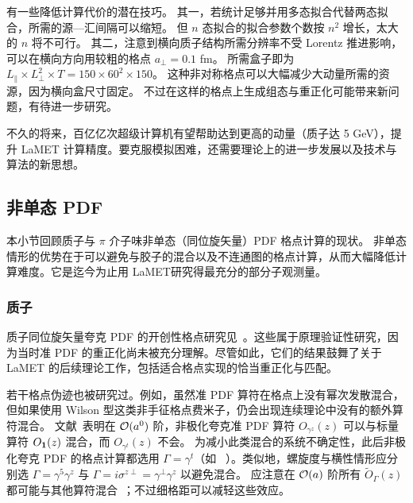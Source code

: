 有一些降低计算代价的潜在技巧。
%
其一，若统计足够并用多态拟合代替两态拟合，所需的源—汇间隔可以缩短。
%
但 $n$ 态拟合的拟合参数个数按 $n^2$ 增长，太大的 $n$ 将不可行。
%
其二，注意到横向质子结构所需分辨率不受 Lorentz 推进影响，可以在横向方向用较粗的格点 $a_\perp=0.1$ fm。
%
所需盒子即为 $L_\parallel\times L_\perp^2\times T=150\times 60^2\times 150$。
%
这种非对称格点可以大幅减少大动量所需的资源，因为横向盒尺寸固定。
%
不过在这样的格点上生成组态与重正化可能带来新问题，有待进一步研究。

不久的将来，百亿亿次超级计算机有望帮助达到更高的动量（质子达 5 GeV），提升 LaMET 计算精度。要克服模拟困难，还需要理论上的进一步发展以及技术与算法的新思想。


\subsection{非单态 PDF}
\label{sec:lattice-pdf}

本小节回顾质子与 $\pi$ 介子味非单态（同位旋矢量）PDF 格点计算的现状。
%
非单态情形的优势在于可以避免与胶子的混合以及不连通图的格点计算，从而大幅降低计算难度。它是迄今为止用 LaMET研究得最充分的部分子观测量。

\subsubsection{质子}
\label{sec:lattice-pdf-proton}

质子同位旋矢量夸克 PDF 的开创性格点研究见~\cite{Lin:2014zya,Alexandrou:2015rja}。这些属于原理验证性研究，因为当时准 PDF 的重正化尚未被充分理解。尽管如此，它们的结果鼓舞了关于 LaMET 的后续理论工作，包括适合格点实现的恰当重正化与匹配。

若干格点伪迹也被研究过。例如，虽然准 PDF 算符在格点上没有幂次发散混合，但如果使用 Wilson 型这类非手征格点费米子，仍会出现连续理论中没有的额外算符混合。
%
文献~\cite{Constantinou:2017sej,Chen:2017mie}表明在 ${\cal O}(a^0)$ 阶，非极化夸克准 PDF 算符 $O_{\gamma^z}(z)$ 可以与标量算符 $O_{\bf 1}(z)$ 混合，而 $O_{\gamma^t}(z)$ 不会。
%
为减小此类混合的系统不确定性，此后非极化夸克 PDF 的格点计算都选用 $\Gamma=\gamma^t$（如 ~\cite{Alexandrou:2017huk,Green:2017xeu,Chen:2017mzz}）。类似地，螺旋度与横性情形应分别选 $\Gamma=\gamma^5\gamma^z$ 与 $\Gamma=i\sigma^{z\perp}=\gamma^\perp\gamma^z$ 以避免混合。
%
应注意在 ${\cal O}(a)$ 阶所有 $\tilde{O}_\Gamma(z)$ 都可能与其他算符混合~\cite{Chen:2017mie}；不过细格距可以减轻这些效应。

